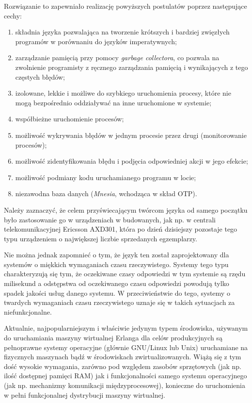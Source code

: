 Rozwiązanie to zapewniało realizację powyższych postulatów poprzez następujące cechy:
\begin{enumerate}
\item składnia języka pozwalająca na tworzenie krótszych i bardziej zwięzłych programów w porównaniu do języków imperatywnych;
\item zarządzanie pamięcią przy pomocy \emph{garbage collectora}, co pozwala na zwolnienie programisty z ręcznego zarządzania pamięcią i wynikających z tego częstych błędów;
\item izolowane, lekkie i możliwe do szybkiego uruchomienia procesy, które nie mogą bezpośrednio oddziaływać na inne uruchomione w systemie;
\item współbieżne uruchomienie procesów;
\item możliwość wykrywania błędów w jednym procesie przez drugi (monitorowanie procesów);
\item możliwość zidentyfikowania błędu i podjęcia odpowiedniej akcji w jego efekcie;
\item możliwość podmiany kodu uruchamianego programu w locie;
\item niezawodna baza danych (\emph{Mnesia}, wchodząca w skład OTP).
\end{enumerate}

Należy zaznaczyć, że celem przyświecającym twórcom języka od samego początku było zastosowanie go w urządzeniach w budowanych, jak np. w centrali telekomunikacyjnej Ericsson AXD301, która po dzień dzisiejszy pozostaje tego typu urządzeniem o największej liczbie sprzedanych egzemplarzy.

Nie można jednak zapomnieć o tym, że język ten został zaprojektowany dla systemów o miękkich wymaganiach czasu rzeczywistego. Systemy tego typu charakteryzują się tym, że oczekiwane czasy odpowiedzi w tym systemie są rzędu milisekund a odstępstwa od oczekiwanego czasu odpowiedzi powodują tylko spadek jakości usług danego systemu. W przeciwieństwie do tego, systemy o twardych wymaganiach czasu rzeczywistego uznaje się w takich sytuacjach za niefunkcjonalne.

Aktualnie, najpopularniejszym i właściwie jedynym typem środowiska, używanym do uruchamiania maszyny wirtualnej Erlanga dla celów produkcyjnych są pełnoprawne systemy operacyjne (głównie GNU/Linux lub Unix) uruchamiane na fizycznych maszynach bądź w środowiskach zwirtualizowanych. Wiążą się z tym dość wysokie wymagania, zarówno pod względem zasobów sprzętowych (jak np. ilość dostępnej pamięci RAM) jak i funkcjonalności samego systemu operacyjnego (jak np. mechanizmy komunikacji międzyprocesowej), konieczne do uruchomienia w pełni funkcjonalnej dystrybucji maszyny wirtualnej.

